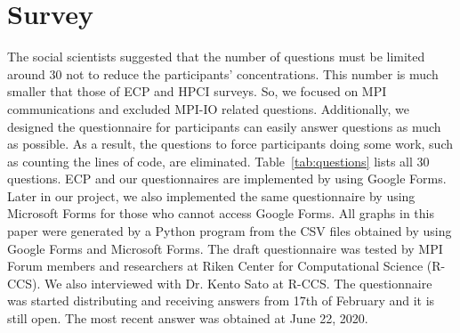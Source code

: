 \documentclass[conference,10pt,letterpaper]{IEEEtran}
\begin{document}
\section{Survey}
%
%
The social scientists suggested that the number of questions must be
limited around 30 not to reduce the participants' concentrations.  
This number is much smaller that those of ECP and HPCI surveys. So, we
focused on MPI communications and excluded MPI-IO related
questions. Additionally, we designed the questionnaire for
participants can easily answer questions as much as possible. As a
result, the questions to force participants doing some work, such as
counting the lines of code, are eliminated. Table~\ref{tab:questions}
lists all 30 questions.
%
ECP and our questionnaires are implemented by using Google Forms. Later
in our project, we also implemented the same questionnaire by using
Microsoft Forms for those who cannot access Google Forms. All graphs
in this paper were generated by a Python program from the CSV files
obtained by using Google Forms and Microsoft Forms.
%
The draft questionnaire was tested by MPI Forum members and
researchers at Riken Center for Computational Science (R-CCS). We also
interviewed with Dr. Kento Sato at R-CCS.
The questionnaire was started distributing and receiving answers from
17th of February and it is still open. The most recent answer was
obtained at June 22, 2020.
%
\end{document}
